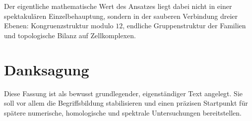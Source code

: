 \documentclass[11pt,a4paper]{article}
\theoremstyle{definition}
\theoremstyle{remark}
\begin{document}
	Der eigentliche mathematische Wert des Ansatzes liegt dabei nicht in einer spektakulären Einzelbehauptung, sondern in der sauberen Verbindung dreier Ebenen: Kongruenzstruktur modulo $12$, endliche Gruppenstruktur der Familien und topologische Bilanz auf Zellkomplexen.
	
	\section*{Danksagung}
	
	Diese Fassung ist als bewusst grundlegender, eigenständiger Text angelegt. Sie soll vor allem die Begriffsbildung stabilisieren und einen präzisen Startpunkt für spätere numerische, homologische und spektrale Untersuchungen bereitstellen.
	
\end{document}
